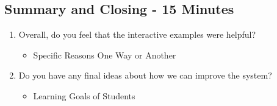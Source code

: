 \subsection{Summary and Closing - 15 Minutes}
\begin{enumerate}
	\item Overall, do you feel that the interactive examples were helpful?
	\begin{itemize}
		\item Specific Reasons One Way or Another
	\end{itemize}
	\item Do you have any final ideas about how we can improve the system?
	\begin{itemize}
		\item Learning Goals of Students
	\end{itemize}
\end{enumerate}